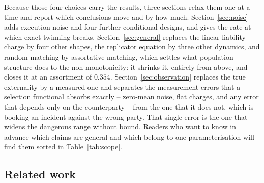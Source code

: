 \documentclass[11pt,a4paper]{article}
\theoremstyle{definition}
\begin{document}
Because those four choices carry the results, three sections relax them one at
a time and report which conclusions move and by how much.
Section~\ref{sec:noise} adds execution noise and four further conditional
designs, and gives the rate at which exact twinning breaks.
Section~\ref{sec:general} replaces the linear liability charge by four other
shapes, the replicator equation by three other dynamics, and random matching
by assortative matching, which settles what population structure does to the
non-monotonicity: it shrinks it, entirely from above, and closes it at an
assortment of $0.354$. Section~\ref{sec:observation} replaces the true
externality by a measured one and separates the measurement errors that a
selection functional absorbs exactly -- zero-mean noise, flat charges, and any
error that depends only on the counterparty -- from the one that it does not,
which is booking an incident against the wrong party. That single error is the
one that widens the dangerous range without bound. Readers who want to know in
advance which claims are general and which belong to one parameterisation will
find them sorted in Table~\ref{tab:scope}.

\subsection{Related work}
\end{document}

